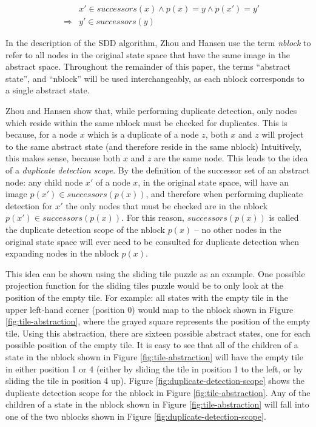 \documentclass{article} \usepackage{aaai} \usepackage{graphicx}
\begin{document}
\begin{eqnarray*}
&&x' \in successors(x) \wedge p(x) = y \wedge p(x') = y' \\
&\Rightarrow& y' \in successors(y)
\end{eqnarray*}

In the description of the SDD algorithm, Zhou and Hansen use the term
\emph{nblock} to refer to all nodes in the original state space that
have the same image in the abstract space.  Throughout the remainder
of this paper, the terms ``abstract state'', and ``nblock'' will be
used interchangeably, as each nblock corresponds to a single abstract
state.

Zhou and Hansen show that, while performing duplicate detection, only
nodes which reside within the same nblock must be checked for
duplicates.  This is because, for a node $x$ which is a duplicate of a
node $z$, both $x$ and $z$ will project to the same abstract state
(and therefore reside in the same nblock) Intuitively, this makes
sense, because both $x$ and $z$ are the same node.  This leads to the
idea of a \emph{duplicate detection scope}.  By the definition of the
successor set of an abstract node: any child node $x'$ of a node $x$,
in the original state space, will have an image $p(x') \in
successors(p(x))$, and therefore when performing duplicate detection
for $x'$ the only nodes that must be checked are in the nblock $p(x')
\in successors(p(x))$.  For this reason, $successors(p(x))$ is called
the duplicate detection scope of the nblock $p(x)$ -- no other nodes
in the original state space will ever need to be consulted for
duplicate detection when expanding nodes in the nblock $p(x)$.

This idea can be shown using the sliding tile puzzle as an example.
One possible projection function for the sliding tiles puzzle would be
to only look at the position of the empty tile.  For example: all
states with the empty tile in the upper left-hand corner (position 0)
would map to the nblock shown in Figure \ref{fig:tile-abstraction},
where the grayed square represents the position of the empty tile.
Using this abstraction, there are sixteen possible abstract states,
one for each possible position of the empty tile.  It is easy to see
that all of the children of a state in the nblock shown in Figure
\ref{fig:tile-abstraction} will have the empty tile in either position
1 or 4 (either by sliding the tile in position 1 to the left, or by
sliding the tile in position 4 up).  Figure
\ref{fig:duplicate-detection-scope} shows the duplicate detection
scope for the nblock in Figure \ref{fig:tile-abstraction}.  Any of the
children of a state in the nblock shown in Figure
\ref{fig:tile-abstraction} will fall into one of the two nblocks shown
in Figure \ref{fig:duplicate-detection-scope}.
\end{document}
